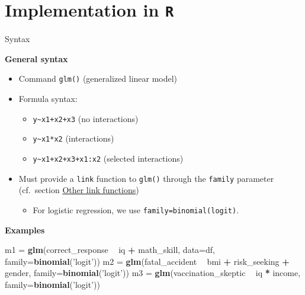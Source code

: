 \documentclass[
  ignorenonframetext,
]{beamer}
\newenvironment{Shaded}{\begin{snugshade}}{\end{snugshade}}
\newcommand{\DataTypeTok}[1]{\textcolor[rgb]{0.13,0.29,0.53}{#1}}
\newcommand{\KeywordTok}[1]{\textcolor[rgb]{0.13,0.29,0.53}{\textbf{#1}}}
\newcommand{\NormalTok}[1]{#1}
\newcommand{\OperatorTok}[1]{\textcolor[rgb]{0.81,0.36,0.00}{\textbf{#1}}}
\newcommand{\StringTok}[1]{\textcolor[rgb]{0.31,0.60,0.02}{#1}}
\providecommand{\tightlist}{%
  \setlength{\itemsep}{0pt}\setlength{\parskip}{0pt}}
\begin{document}
\hypertarget{implementation-in-r}{%
\section{\texorpdfstring{Implementation in
\texttt{R}}{Implementation in R}}\label{implementation-in-r}}

\begin{frame}[fragile]{Syntax}
\protect\hypertarget{syntax}{}

\textbf{General syntax}

\begin{itemize}
\tightlist
\item
  Command \texttt{glm()} (generalized linear model)
\item
  Formula syntax:

  \begin{itemize}
  \tightlist
  \item
    \texttt{y\textasciitilde{}x1+x2+x3} (no interactions)
  \item
    \texttt{y\textasciitilde{}x1*x2} (interactions)
  \item
    \texttt{y\textasciitilde{}x1+x2+x3+x1:x2} (selected interactions)
  \end{itemize}
\item
  Must provide a \texttt{link} function to \texttt{glm()} through the
  \texttt{family} parameter (cf.~section
  \protect\hyperlink{other-link-functions}{Other link functions})

  \begin{itemize}
  \tightlist
  \item
    For logistic regression, we use
    \texttt{family=binomial(\textquotesingle{}logit\textquotesingle{})}.
  \end{itemize}
\end{itemize}

\textbf{Examples} \tiny

\begin{Shaded}
\begin{Highlighting}[]
\NormalTok{m1 =}\StringTok{ }\KeywordTok{glm}\NormalTok{(correct_response }\OperatorTok{~}\StringTok{ }\NormalTok{iq }\OperatorTok{+}\StringTok{ }\NormalTok{math_skill, }\DataTypeTok{data=}\NormalTok{df, }\DataTypeTok{family=}\KeywordTok{binomial}\NormalTok{(}\StringTok{'logit'}\NormalTok{))}
\NormalTok{m2 =}\StringTok{ }\KeywordTok{glm}\NormalTok{(fatal_accident }\OperatorTok{~}\StringTok{ }\NormalTok{bmi }\OperatorTok{+}\StringTok{ }\NormalTok{risk_seeking }\OperatorTok{+}\StringTok{ }\NormalTok{gender, }\DataTypeTok{family=}\KeywordTok{binomial}\NormalTok{(}\StringTok{'logit'}\NormalTok{))}
\NormalTok{m3 =}\StringTok{ }\KeywordTok{glm}\NormalTok{(vaccination_skeptic }\OperatorTok{~}\StringTok{ }\NormalTok{iq }\OperatorTok{*}\StringTok{ }\NormalTok{income, }\DataTypeTok{family=}\KeywordTok{binomial}\NormalTok{(}\StringTok{'logit'}\NormalTok{))}
\end{Highlighting}
\end{Shaded}

\normalsize

\end{frame}
\end{document}
